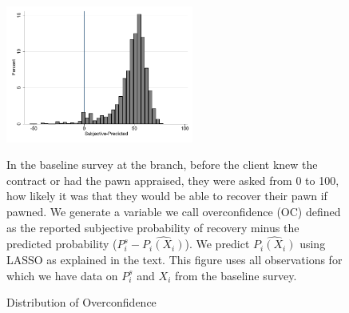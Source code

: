 \documentclass[oneside,11pt]{article}
\begin{document}
\begin{figure}[H]
        \caption{Distribution of Overconfidence}
    \label{oc_hist}
    \begin{center}
        \centering
        \includegraphics[width=0.55\textwidth]{Figuras/oc_hist.pdf}
    \end{center}
    \scriptsize
     In the baseline survey at the branch, before the client knew the contract or had the pawn appraised, they were asked from 0 to 100, how likely it was that they would be able to recover their pawn if pawned. We generate a variable we call overconfidence (OC) defined as the reported subjective probability of recovery minus the predicted probability ($P^s_i-\widehat{P_i(X_i)}$). We predict $\widehat{P_i(X_i)}$ using LASSO as explained in the text. This figure uses all observations for which we have data on $P^s_i$ and $X_i$ from the baseline survey.
     
\end{figure}
\end{document}
